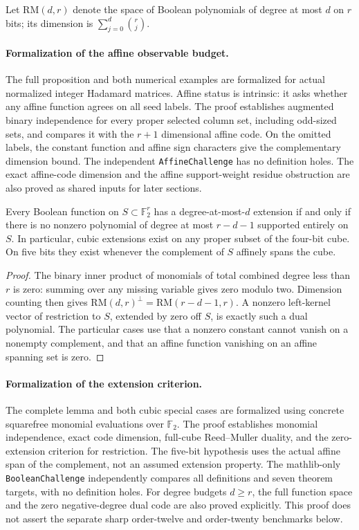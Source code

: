 Let $\mathrm{RM}(d,r)$ denote the space of Boolean polynomials of degree
at most $d$ on $r$ bits; its dimension is $\sum_{j=0}^d\binom rj$.
\paragraph{Formalization of the affine observable budget.}
The full proposition and both numerical examples are formalized for
actual normalized integer Hadamard matrices. Affine status is intrinsic:
it asks whether any affine function agrees on all seed labels.
The proof establishes augmented binary independence for every proper
selected column set, including odd-sized sets, and compares it with the
$r+1$ dimensional affine code. On the omitted labels, the constant
function and affine sign characters give the complementary dimension
bound. The independent \texttt{AffineChallenge} has no definition holes.
The exact affine-code dimension and the affine support-weight residue
obstruction are also proved as shared inputs for later sections.

\begin{lemma}
\label{s18:lem:nonlinear-extension}
Every Boolean function on $S\subset\mathbb F_2^r$ has a degree-at-most-$d$
extension if and only if there is no nonzero polynomial of degree at
most $r-d-1$ supported entirely on $S$. In particular, cubic extensions
exist on any proper subset of the four-bit cube. On five bits they
exist whenever the complement of $S$ affinely spans the cube.
\end{lemma}
\begin{proof}
The binary inner product of monomials of total combined degree less
than $r$ is zero: summing over any missing variable gives zero modulo
two. Dimension counting then gives
$\mathrm{RM}(d,r)^\perp=\mathrm{RM}(r-d-1,r)$.
A nonzero left-kernel vector of restriction to $S$, extended by zero
off $S$, is exactly such a dual polynomial. The particular cases use
that a nonzero constant cannot vanish on a nonempty complement, and
that an affine function vanishing on an affine spanning set is zero.
\end{proof}

\paragraph{Formalization of the extension criterion.}
The complete lemma and both cubic special cases are formalized using
concrete squarefree monomial evaluations over $\mathbb F_2$. The proof
establishes monomial independence, exact code dimension, full-cube
Reed--Muller duality, and the zero-extension criterion for restriction.
The five-bit hypothesis uses the actual affine span of the complement,
not an assumed extension property. The mathlib-only
\texttt{BooleanChallenge} independently compares all definitions and
seven theorem targets, with no definition holes. For degree budgets $d\ge r$, the full function space and the zero
negative-degree dual code are also proved explicitly. This proof does not
assert the separate sharp order-twelve and order-twenty benchmarks below.

